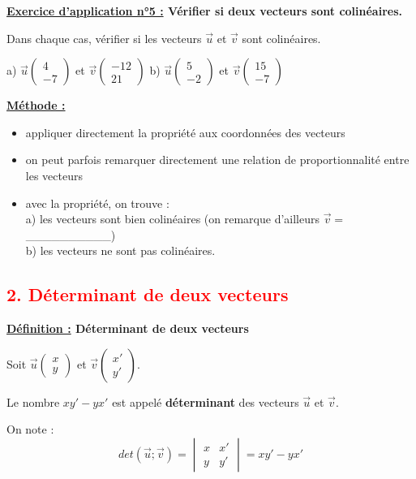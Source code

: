 \documentclass[12pt]{article}
\newcommand*{\Coord}[2]{%
  \ensuremath{
    \begin{pmatrix} 
      #1\\ 
      #2 
    \end{pmatrix}}}
\newcommand*{\Det}[4]{%
  \ensuremath{
    \begin{vmatrix} 
      #1 & #2 \\
      #3 & #4 
    \end{vmatrix}}}
\begin{document}
\vspace{10pt}


\begin{mdframed}[
    linewidth=1pt,
    roundcorner=5pt,
    linecolor=RoyalBlue,
    innertopmargin=10pt,
    innerbottommargin=10pt
]
{\color{RoyalBlue}\textbf{\underline{Exercice d'application n°5 :} 
Vérifier si deux vecteurs sont colinéaires.}}
\vspace{10pt}

Dans chaque cas, vérifier si les vecteurs $\overrightarrow{u}$ et $\overrightarrow{v}$ 
sont colinéaires.

a) $\overrightarrow{u}\Coord{4}{-7}$ et $\overrightarrow{v}\Coord{-12}{21}$
\hspace{1cm} b) $\overrightarrow{u}\Coord{5}{-2}$ et $\overrightarrow{v}\Coord{15}{-7}$

\begin{mdframed}[
    linewidth=1pt,
    roundcorner=5pt,
    linecolor=black,
    innertopmargin=10pt,
    innerbottommargin=10pt,
    backgroundcolor=gray!15
]
\underline{\textbf{Méthode :}}
\begin{itemize}
    \item appliquer directement la propriété aux coordonnées des vecteurs
    \item on peut parfois remarquer directement une relation de proportionnalité 
    entre les vecteurs
    \item avec la propriété, on trouve :\\a) les vecteurs sont bien colinéaires (on 
    remarque d'ailleurs  
    $\overrightarrow{v} = $\_\_\_\_\_\_\_\_\_\_)
    \\b) les vecteurs ne sont pas colinéaires.
\end{itemize}
\end{mdframed}

\end{mdframed}

\vspace{20pt}

\subsection*{\textcolor{red}{2. Déterminant de deux vecteurs}}

\vspace{5pt}

\begin{mdframed}[
    linewidth=1pt,
    roundcorner=5pt,
    linecolor=ForestGreen,
    innertopmargin=10pt,
    innerbottommargin=10pt
]
{\color{ForestGreen}\textbf{\underline{Définition :} Déterminant de deux vecteurs}}

\vspace{5pt}
Soit $\overrightarrow{u}\Coord{x}{y}$ et $\overrightarrow{v}\Coord{x'}{y'}$.

\vspace{5pt}
Le nombre $xy' - yx'$ est appelé \textbf{déterminant} des vecteurs $\overrightarrow{u}$ 
et $\overrightarrow{v}$.

\vspace{5pt}
On note :
\[
det(\overrightarrow{u} ; \overrightarrow{v}) = \Det{x}{x'}{y}{y'} = xy' - yx'
\]
\end{mdframed}
\end{document}
